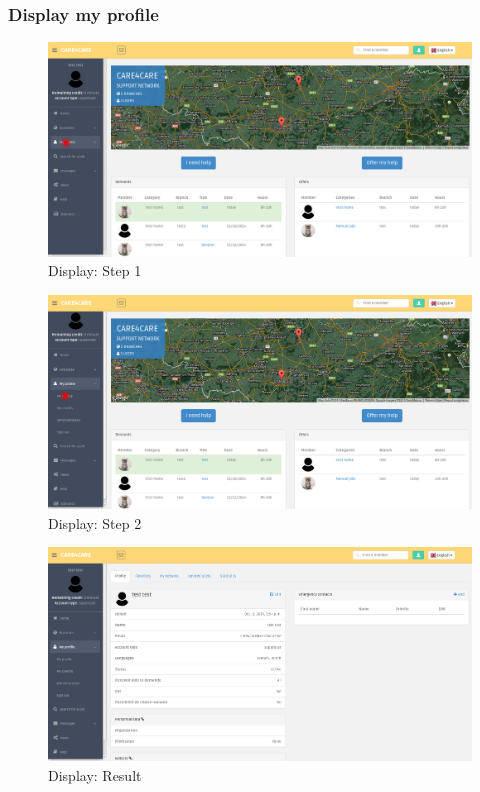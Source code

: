 \documentclass{article}
\begin{document}
\subsubsection{Display my profile}
\begin{figure}[!ht]
   \includegraphics[width=\textwidth]{img/profil1.png}
   \caption{Display: Step 1}
\end{figure}
\begin{figure}[!ht]
   \includegraphics[width=\textwidth]{img/profil2.png}
   \caption{Display: Step 2}
\end{figure}
\begin{figure}[!ht]
   \includegraphics[width=\textwidth]{img/profil3.png}
   \caption{Display: Result}
\end{figure}
\end{document}
